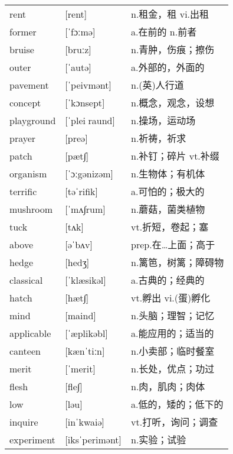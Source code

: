 \documentclass[a4paper]{article}
\begin{document}
\section{}
\begin{tabular}{l l l}

rent & [rent] & n.租金，租 vi.出租 \\
former & [ˈfɔːmə] & a.在前的 n.前者 \\
bruise & [bruːz] & n.青肿，伤痕；擦伤 \\
outer & [ˈautə] & a.外部的，外面的 \\
pavement & [ˈpeivmənt] & n.(英)人行道 \\
concept & [ˈkɔnsept] & n.概念，观念，设想 \\
playground & [ˈpleiraund] & n.操场，运动场 \\
prayer & [preə] & n.祈祷，祈求 \\
patch & [pæt∫] & n.补钉；碎片 vt.补缀 \\
organism & [ˈɔːgənizəm] & n.生物体；有机体 \\
terrific & [təˈrifik] & a.可怕的；极大的 \\
mushroom & [ˈmʌ∫rum] & n.蘑菇，菌类植物 \\
tuck & [tʌk] & vt.折短，卷起；塞 \\
above & [əˈbʌv] & prep.在…上面；高于 \\
hedge & [hedʒ] & n.篱笆，树篱；障碍物 \\
classical & [ˈklæsikəl] & a.古典的；经典的 \\
hatch & [hæt∫] & vt.孵出 vi.(蛋)孵化 \\
mind & [maind] & n.头脑；理智；记忆 \\
applicable & [ˈæplikəbl] & a.能应用的；适当的 \\
canteen & [kænˈtiːn] & n.小卖部；临时餐室 \\
merit & [ˈmerit] & n.长处，优点；功过 \\
flesh & [fle∫] & n.肉，肌肉；肉体 \\
low & [ləu] & a.低的，矮的；低下的 \\
inquire & [inˈkwaiə] & vt.打听，询问；调查 \\
experiment & [iksˈperimənt] & n.实验；试验 \\

\end{tabular}
\end{document}
